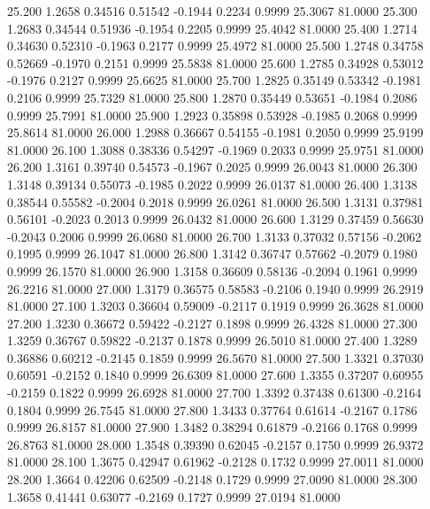   25.200   1.2658   0.34516   0.51542  -0.1944   0.2234   0.9999  25.3067  81.0000
  25.300   1.2683   0.34544   0.51936  -0.1954   0.2205   0.9999  25.4042  81.0000
  25.400   1.2714   0.34630   0.52310  -0.1963   0.2177   0.9999  25.4972  81.0000
  25.500   1.2748   0.34758   0.52669  -0.1970   0.2151   0.9999  25.5838  81.0000
  25.600   1.2785   0.34928   0.53012  -0.1976   0.2127   0.9999  25.6625  81.0000
  25.700   1.2825   0.35149   0.53342  -0.1981   0.2106   0.9999  25.7329  81.0000
  25.800   1.2870   0.35449   0.53651  -0.1984   0.2086   0.9999  25.7991  81.0000
  25.900   1.2923   0.35898   0.53928  -0.1985   0.2068   0.9999  25.8614  81.0000
  26.000   1.2988   0.36667   0.54155  -0.1981   0.2050   0.9999  25.9199  81.0000
  26.100   1.3088   0.38336   0.54297  -0.1969   0.2033   0.9999  25.9751  81.0000
  26.200   1.3161   0.39740   0.54573  -0.1967   0.2025   0.9999  26.0043  81.0000
  26.300   1.3148   0.39134   0.55073  -0.1985   0.2022   0.9999  26.0137  81.0000
  26.400   1.3138   0.38544   0.55582  -0.2004   0.2018   0.9999  26.0261  81.0000
  26.500   1.3131   0.37981   0.56101  -0.2023   0.2013   0.9999  26.0432  81.0000
  26.600   1.3129   0.37459   0.56630  -0.2043   0.2006   0.9999  26.0680  81.0000
  26.700   1.3133   0.37032   0.57156  -0.2062   0.1995   0.9999  26.1047  81.0000
  26.800   1.3142   0.36747   0.57662  -0.2079   0.1980   0.9999  26.1570  81.0000
  26.900   1.3158   0.36609   0.58136  -0.2094   0.1961   0.9999  26.2216  81.0000
  27.000   1.3179   0.36575   0.58583  -0.2106   0.1940   0.9999  26.2919  81.0000
  27.100   1.3203   0.36604   0.59009  -0.2117   0.1919   0.9999  26.3628  81.0000
  27.200   1.3230   0.36672   0.59422  -0.2127   0.1898   0.9999  26.4328  81.0000
  27.300   1.3259   0.36767   0.59822  -0.2137   0.1878   0.9999  26.5010  81.0000
  27.400   1.3289   0.36886   0.60212  -0.2145   0.1859   0.9999  26.5670  81.0000
  27.500   1.3321   0.37030   0.60591  -0.2152   0.1840   0.9999  26.6309  81.0000
  27.600   1.3355   0.37207   0.60955  -0.2159   0.1822   0.9999  26.6928  81.0000
  27.700   1.3392   0.37438   0.61300  -0.2164   0.1804   0.9999  26.7545  81.0000
  27.800   1.3433   0.37764   0.61614  -0.2167   0.1786   0.9999  26.8157  81.0000
  27.900   1.3482   0.38294   0.61879  -0.2166   0.1768   0.9999  26.8763  81.0000
  28.000   1.3548   0.39390   0.62045  -0.2157   0.1750   0.9999  26.9372  81.0000
  28.100   1.3675   0.42947   0.61962  -0.2128   0.1732   0.9999  27.0011  81.0000
  28.200   1.3664   0.42206   0.62509  -0.2148   0.1729   0.9999  27.0090  81.0000
  28.300   1.3658   0.41441   0.63077  -0.2169   0.1727   0.9999  27.0194  81.0000
